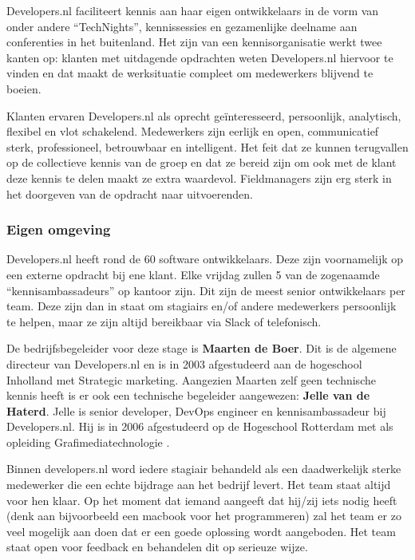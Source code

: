 Developers.nl faciliteert kennis aan haar eigen ontwikkelaars in de vorm van onder andere \enquote{TechNights}, kennissessies en gezamenlijke deelname aan conferenties in het buitenland. Het zijn van een kennisorganisatie werkt twee kanten op: klanten met uitdagende opdrachten weten Developers.nl hiervoor te vinden en dat maakt de werksituatie compleet om medewerkers blijvend te boeien.

Klanten ervaren Developers.nl als oprecht geïnteresseerd, persoonlijk, analytisch, flexibel en vlot schakelend. Medewerkers zijn eerlijk en open, communicatief sterk, professioneel, betrouwbaar en intelligent. Het feit dat ze kunnen terugvallen op de collectieve kennis van de groep en dat ze bereid zijn om ook met de klant deze kennis te delen maakt ze extra waardevol. Fieldmanagers zijn erg sterk in het doorgeven van de opdracht naar uitvoerenden. 

\subsubsection{Eigen omgeving}
Developers.nl heeft rond de 60 software ontwikkelaars. Deze zijn voornamelijk op een externe opdracht bij ene klant. Elke vrijdag zullen 5 van de zogenaamde \enquote{kennisambassadeurs} op kantoor zijn. Dit zijn de meest senior ontwikkelaars per team. Deze zijn dan in staat om stagiairs en/of andere medewerkers persoonlijk te helpen, maar ze zijn altijd bereikbaar via Slack of telefonisch.

De bedrijfsbegeleider voor deze stage is \textbf{Maarten de Boer}. Dit is de algemene directeur van Developers.nl en is in 2003 afgestudeerd aan de hogeschool Inholland met Strategic marketing. Aangezien Maarten zelf geen technische kennis heeft is er ook een technische begeleider aangewezen: \textbf{Jelle van de Haterd}. Jelle is senior developer, DevOps engineer en kennisambassadeur bij Developers.nl. Hij is in 2006 afgestudeerd op de Hogeschool Rotterdam met als opleiding Grafimediatechnologie \parencite{Afstudeervoorstel}.

Binnen developers.nl word iedere stagiair behandeld als een daadwerkelijk sterke medewerker die een echte bijdrage aan het bedrijf levert. Het team staat altijd voor hen klaar. Op het moment dat iemand aangeeft dat hij/zij iets nodig heeft (denk aan bijvoorbeeld een macbook voor het programmeren) zal het team er zo veel mogelijk aan doen dat er een goede oplossing wordt aangeboden. Het team staat open voor feedback en behandelen dit op serieuze wijze.

